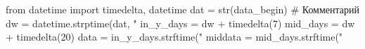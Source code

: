 \begin{pycode}	
from datetime import timedelta, datetime
dat = str(data_begin)
# Комментарий
dw = datetime.strptime(dat, "%
in_y_days = dw + timedelta(7)
mid_days = dw + timedelta(20)
data = in_y_days.strftime("%
middata = mid_days.strftime("%

\end{pycode}

